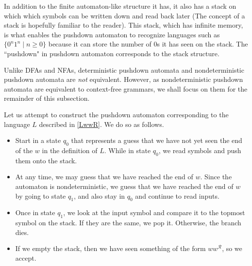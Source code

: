 In addition to the finite automaton-like structure it has, it also has a stack on which which symbols can be written down and read back later (The concept of a stack is hopefully familiar to the reader). This stack, which has infinite memory, is what enables the pushdown automaton to recognize languages such as $\{0^n1^n\mid n\geq 0\}$ because it can store the number of $0$s it has seen on the stack. The ``pushdown" in pushdown automaton corresponds to the stack structure.

\vspace{3mm}
Unlike DFAs and NFAs, deterministic pushdown automata and nondeterministic pushdown automata are \textit{not} equivalent. However, as nondeterministic pushdown automata are equivalent to context-free grammars, we shall focus on them for the remainder of this subsection.

\begin{example}
Let us attempt to construct the pushdown automaton corresponding to the language $L$ described in \ref{LwwR}. We do so as follows.
\begin{itemize}
    \item Start in a state $q_0$ that represents a guess that we have not yet seen the end of the $w$ in the definition of $L$. While in state $q_0$, we read symbols and push them onto the stack.
    \item At any time, we may guess that we have reached the end of $w$. Since the automaton is nondeterministic, we guess that we have reached the end of $w$ by going to state $q_1$, and also stay in $q_0$ and continue to read inputs.
    \item Once in state $q_1$, we look at the input symbol and compare it to the topmost symbol on the stack. If they are the same, we pop it. Otherwise, the branch dies.
    \item If we empty the stack, then we have seen something of the form $ww^\mathcal{R}$, so we accept.
\end{itemize}
\end{example}

